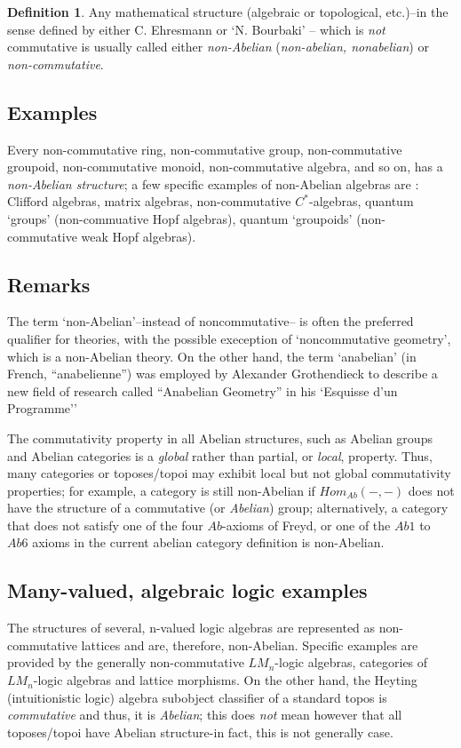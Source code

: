 \documentclass[12pt]{article}
\theoremstyle{plain}
\theoremstyle{definition}
\newtheorem{definition}{Definition}[section]
\numberwithin{equation}{section}
\newcommand{\med}{\medbreak}
\begin{document}
\begin{definition} Any mathematical structure (algebraic or topological, etc.)--in the sense defined by either
C. Ehresmann \cite{EC65, EC66} or `N. Bourbaki' -- which is {\em not} commutative is usually called either {\em non-Abelian} ({\em non-abelian, nonabelian}) or {\em non-commutative}. 
\end{definition}

\subsection{Examples} 
 Every non-commutative ring, non-commutative group, non-commutative groupoid, non-commutative monoid, non-commutative algebra, and so on, has a {\em non-Abelian structure}; a few specific examples of non-Abelian algebras are : Clifford algebras, matrix algebras, non-commutative $C^*$-algebras, quantum `groups' (non-commuative Hopf algebras), quantum `groupoids' (non-commutative weak Hopf algebras).

\subsection{Remarks}  

 The term `non-Abelian'--instead of noncommutative-- is often the preferred qualifier for theories,
with the possible exeception of `noncommutative geometry', which is a non-Abelian theory.
On the other hand, the term `anabelian' (in French, ``anabelienne'') was employed by Alexander Grothendieck to 
describe a new field of research called ``Anabelian Geometry'' in his `Esquisse d'un Programme''

 The commutativity property in all Abelian structures, such as Abelian groups and Abelian categories is a {\em global} rather than partial, or {\em local}, property. Thus, many categories or toposes/topoi may exhibit
local but not global commutativity properties; for example, a category is still non-Abelian 
if $Hom_{Ab}(-, -)$ does not have the structure of a commutative (or {\em Abelian}) group;
alternatively, a category that does not satisfy one of the four $Ab$-axioms of Freyd, or one of the
$Ab1$ to $Ab6$ axioms in the current abelian category definition is non-Abelian.
\med

\subsection{Many-valued, algebraic logic examples}    
The structures of several, n-valued logic algebras are represented as non-commutative lattices and are, therefore, non-Abelian. Specific examples are provided by the generally non-commutative $LM_n$-logic algebras, categories of $LM_n$-logic algebras and lattice morphisms. On the other hand, the Heyting (intuitionistic logic) algebra subobject classifier of a standard topos is {\em commutative} and thus, it is {\em Abelian}; this does {\em not} mean however that all toposes/topoi have Abelian structure-in fact, this is not generally case. \\
\end{document}
